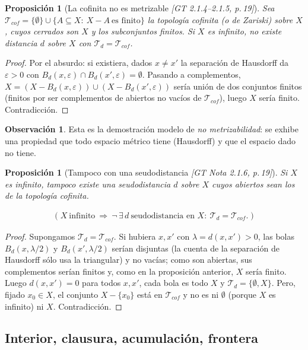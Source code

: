 \documentclass[11pt,a4paper]{article}
\newcommand{\lgc}[1]{\par\vspace{-3pt}\begin{gather*}\big(\;#1\;\big)\end{gather*}\vspace{-6pt}}
\theoremstyle{definition}
\newtheorem{observacion}[definicion]{Observación}
\theoremstyle{plain}
\newtheorem{proposicion}[definicion]{Proposición}
\newcommand{\fnt}[1]{{\normalfont\small\itshape\color{gray!150!black}[#1]}}
\newcommand{\Bola}[2]{B_d(#1,#2)}
\newcommand{\tp}{\mathcal{T}}
\begin{document}
\begin{proposicion}[La cofinita no es metrizable \fnt{GT 2.1.4--2.1.5, p.\,19}]
Sea $\tp_{cof}=\{\emptyset\}\cup\{A\subseteq X:\ X-A\ \text{es finito}\}$ la \emph{topología cofinita} (o de Zariski) sobre $X$, cuyos cerrados son $X$ y los subconjuntos finitos. Si $X$ es infinito, no existe distancia $d$ sobre $X$ con $\tp_d=\tp_{cof}$.
\end{proposicion}

\begin{proof}
Por el absurdo: si existiera, dados $x\ne x'$ la separación de Hausdorff da $\varepsilon>0$ con $\Bola{x}{\varepsilon}\cap\Bola{x'}{\varepsilon}=\emptyset$. Pasando a complementos,
$X=(X-\Bola{x}{\varepsilon})\cup(X-\Bola{x'}{\varepsilon})$ sería unión de dos conjuntos finitos (finitos por ser complementos de abiertos no vacíos de $\tp_{cof}$), luego $X$ sería finito. Contradicción.
\end{proof}

\begin{observacion}
Esta es la demostración modelo de \emph{no metrizabilidad}: se exhibe una propiedad que todo espacio métrico tiene (Hausdorff) y que el espacio dado no tiene.
\end{observacion}

\begin{proposicion}[Tampoco con una seudodistancia \fnt{GT Nota 2.1.6, p.\,19}]\label{hu:cofseudo}
Si $X$ es infinito, tampoco existe una seudodistancia $d$ sobre $X$ cuyos abiertos sean los de la topología cofinita.
\lgc{X\ \text{infinito}\ \Rightarrow\ \neg\,\exists\,d\ \text{seudodistancia en } X:\ \tp_d=\tp_{cof}.}
\end{proposicion}

\begin{proof}
Supongamos $\tp_d=\tp_{cof}$. Si hubiera $x,x'$ con $\lambda=d(x,x')>0$, las bolas $\Bola{x}{\lambda/2}$ y $\Bola{x'}{\lambda/2}$ serían disjuntas (la cuenta de la separación de Hausdorff sólo usa la triangular) y no vacías; como son abiertas, sus complementos serían finitos y, como en la proposición anterior, $X$ sería finito. Luego $d(x,x')=0$ para todos $x,x'$, cada bola es todo $X$ y $\tp_d=\{\emptyset,X\}$. Pero, fijado $x_0\in X$, el conjunto $X-\{x_0\}$ está en $\tp_{cof}$ y no es ni $\emptyset$ (porque $X$ es infinito) ni $X$. Contradicción.
\end{proof}

\subsection{Interior, clausura, acumulación, frontera}\label{sec:intcl}
\end{document}
